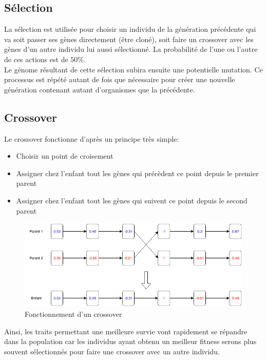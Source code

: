 \documentclass{article}
\begin{document}
\subsection{Sélection}

La sélection est utilisée pour choisir un individu de la génération précédente qui va soit passer ses gènes directement (être cloné), soit faire un crossover avec les gènes d'un autre individu lui aussi sélectionné. La probabilité de l'une ou l'autre de ces actions est de 50\%.\\
Le génome résultant de cette sélection subira ensuite une potentielle mutation. Ce processus est répété autant de fois que nécessaire pour créer une nouvelle génération contenant autant d'organismes que la précédente.

\subsection{Crossover}

Le crossover fonctionne d'après un principe très simple:\\
\begin{itemize}
\item Choisir un point de croisement
\item Assigner chez l'enfant tout les gènes qui précèdent ce point depuis le premier parent
\item Assigner chez l'enfant tout les gènes qui suivent ce point depuis le second parent
\end{itemize}

\begin{figure}[h]
\begin{center}
	\includegraphics[scale=0.6]{"crossover.png"} 
	\caption{Fonctionnement d'un crossover}
\end{center}
\end{figure}
\newpage

Ainsi, les traits permettant une meilleure survie vont rapidement se répandre dans la population car les individus ayant obtenu un meilleur fitness serons plus souvent sélectionnés pour faire une crossover avec un autre individu.
\end{document}
